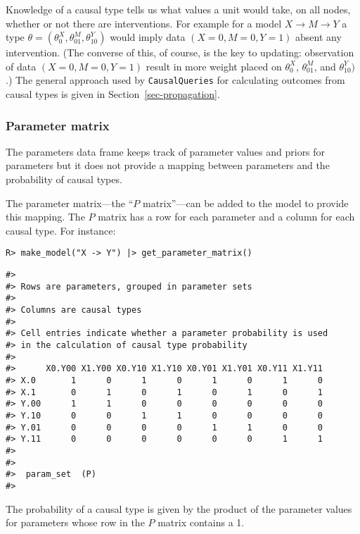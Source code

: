 \documentclass[
  11pt,
  article]{jss}
\begin{document}
Knowledge of a causal type tells us what values a unit would take, on
all nodes, whether or not there are interventions. For example for a
model \(X \rightarrow M \rightarrow Y\) a type
\(\theta = (\theta^X_0, \theta^M_{01}, \theta^Y_{10})\) would imply data
\((X=0, M=0, Y=1)\) absent any intervention. (The converse of this, of
course, is the key to updating: observation of data \((X=0, M=0, Y=1)\)
result in more weight placed on \(\theta^X_0\), \(\theta^M_{01}\), and
\(\theta^Y_{10})\).) The general approach used by \texttt{CausalQueries}
for calculating outcomes from causal types is given in
Section~\ref{sec-propagation}.

\hypertarget{parameter-matrix}{%
\subsubsection{Parameter matrix}\label{parameter-matrix}}

The parameters data frame keeps track of parameter values and priors for
parameters but it does not provide a mapping between parameters and the
probability of causal types.

The parameter matrix---the ``\(P\) matrix''---can be added to the model
to provide this mapping. The \(P\) matrix has a row for each parameter
and a column for each causal type. For instance:

\begin{verbatim}
R> make_model("X -> Y") |> get_parameter_matrix()
\end{verbatim}

\begin{verbatim}
#> 
#> Rows are parameters, grouped in parameter sets
#> 
#> Columns are causal types
#> 
#> Cell entries indicate whether a parameter probability is used
#> in the calculation of causal type probability
#> 
#>      X0.Y00 X1.Y00 X0.Y10 X1.Y10 X0.Y01 X1.Y01 X0.Y11 X1.Y11
#> X.0       1      0      1      0      1      0      1      0
#> X.1       0      1      0      1      0      1      0      1
#> Y.00      1      1      0      0      0      0      0      0
#> Y.10      0      0      1      1      0      0      0      0
#> Y.01      0      0      0      0      1      1      0      0
#> Y.11      0      0      0      0      0      0      1      1
#> 
#>  
#>  param_set  (P)
#> 
\end{verbatim}

The probability of a causal type is given by the product of the
parameter values for parameters whose row in the \(P\) matrix contains a
1.
\end{document}
